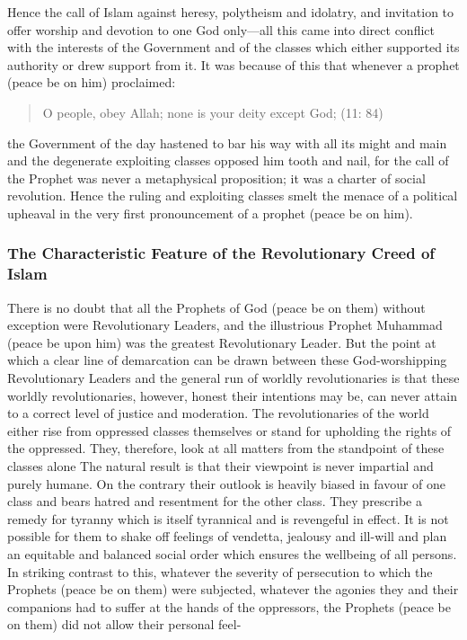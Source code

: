 Hence the call of Islam against heresy, polytheism and idolatry, and
invitation to offer worship and devotion to one God only---all this came
into direct conflict with the interests of the Government and of the
classes which either supported its authority or drew support from it. It
was because of this that whenever a prophet (peace be on him)
proclaimed:

\begin{quote}
O people, obey Allah; none is your deity except God; (11: 84)
\end{quote}

the Government of the day hastened to bar his way with all its might and
main and the degenerate exploiting classes opposed him tooth and nail,
for the call of the Prophet was never a metaphysical proposition; it was
a charter of social revolution. Hence the ruling and exploiting classes
smelt the menace of a political upheaval in the very first pronouncement
of a prophet (peace be on him).

\hypertarget{the-characteristic-feature-of-the-revolutionary-creed-of-islam}{%
\subsubsection{The Characteristic Feature of the Revolutionary Creed of
Islam}\label{the-characteristic-feature-of-the-revolutionary-creed-of-islam}}

There is no doubt that all the Prophets of God (peace be on them)
without exception were Revolutionary Leaders, and the illustrious
Prophet Muhammad (peace be upon him) was the greatest Revolutionary
Leader. But the point at which a clear line of demarcation can be drawn
between these God-worshipping Revolutionary Leaders and the general run
of worldly revolutionaries is that these worldly revolutionaries,
however, honest their intentions may be, can never attain to a correct
level of justice and moderation. The revolutionaries of the world either
rise from oppressed classes themselves or stand for upholding the rights
of the oppressed. They, therefore, look at all matters from the
standpoint of these classes alone The natural result is that their
viewpoint is never impartial and purely humane. On the contrary their
outlook is heavily biased in favour of one class and bears hatred and
resentment for the other class. They prescribe a remedy for tyranny
which is itself tyrannical and is revengeful in effect. It is not
possible for them to shake off feelings of vendetta, jealousy and
ill-will and plan an equitable and balanced social order which ensures
the wellbeing of all persons. In striking contrast to this, whatever the
severity of persecution to which the Prophets (peace be on them) were
subjected, whatever the agonies they and their companions had to suffer
at the hands of the oppressors, the Prophets (peace be on them) did not
allow their personal feel-

